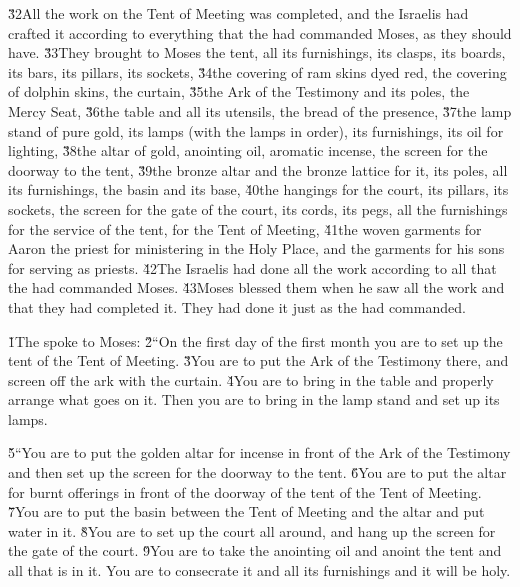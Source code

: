 \v{32}All the work on the Tent of Meeting was completed, and the Israelis had crafted it according to everything that the  had commanded Moses, as they should have. \v{33}They brought to Moses the tent, all its furnishings, its clasps, its boards, its bars, its pillars, its sockets, \v{34}the covering of ram skins dyed red, the covering of dolphin skins, the curtain, \v{35}the Ark of the Testimony and its poles, the Mercy Seat, \v{36}the table and all its utensils, the bread of the presence, \v{37}the lamp stand of pure gold, its lamps (with the lamps in order), its furnishings, its oil for lighting, \v{38}the altar of gold, anointing oil, aromatic incense, the screen for the doorway to the tent, \v{39}the bronze altar and the bronze lattice for it, its poles, all its furnishings, the basin and its base, \v{40}the hangings for the court, its pillars, its sockets, the screen for the gate of the court, its cords, its pegs, all the furnishings for the service of the tent, for the Tent of Meeting, \v{41}the woven garments for Aaron the priest for ministering in the Holy Place, and the garments for his sons for serving as priests. \v{42}The Israelis had done all the work according to all that the  had commanded Moses. \v{43}Moses blessed them when he saw all the work and that they had completed it. They had done it just as the  had commanded.

\v{1}The  spoke to Moses: \v{2}``On the first day of the first month you are to set up the tent of the Tent of Meeting. \v{3}You are to put the Ark of the Testimony there, and screen off the ark with the curtain. \v{4}You are to bring in the table and properly arrange what goes on it. Then you are to bring in the lamp stand and set up its lamps.

\v{5}``You are to put the golden altar for incense in front of the Ark of the Testimony and then set up the screen for the doorway to the tent. \v{6}You are to put the altar for burnt offerings in front of the doorway of the tent of the Tent of Meeting. \v{7}You are to put the basin between the Tent of Meeting and the altar and put water in it. \v{8}You are to set up the court all around, and hang up the screen for the gate of the court. \v{9}You are to take the anointing oil and anoint the tent and all that is in it. You are to consecrate it and all its furnishings and it will be holy.


